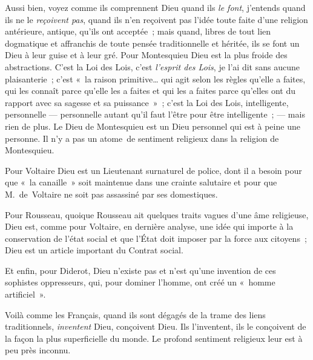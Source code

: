 \documentclass[french,twoside]{book} %
\begin{document}
\noindent Aussi bien, voyez comme ils comprennent Dieu quand ils {\itshape le font}, j’entends quand ils ne le {\itshape reçoivent pas}, quand ils n’en reçoivent pas l’idée toute faite d’une religion antérieure, antique, qu’ils ont acceptée ; mais quand, libres de tout lien dogmatique et affranchis de toute pensée traditionnelle et héritée, ils se font un Dieu à leur guise et à leur gré. Pour Montesquieu Dieu est la plus froide des abstractions. C’est la Loi des Lois, c’est \emph{l’esprit des Lois}, je l’ai dit sans aucune plaisanterie ; c’est « la raison primitive… qui agit selon les règles qu’elle a faites, qui les connaît parce qu’elle les a faites  et qui les a faites parce qu’elles ont du rapport avec sa sagesse et sa puissance » ; c’est la Loi des Lois, intelligente, personnelle — personnelle autant qu’il faut l’être pour être intelligente ; — mais rien de plus. Le Dieu de Montesquieu est un Dieu personnel qui est à peine une personne. Il n’y a pas un atome de sentiment religieux dans la religion de Montesquieu.\par
Pour Voltaire Dieu est un Lieutenant surnaturel de police, dont il a besoin pour que « la canaille » soit maintenue dans une crainte salutaire et pour que M. de Voltaire ne soit pas assassiné par ses domestiques.\par
Pour Rousseau, quoique Rousseau ait quelques traits vagues d’une âme religieuse, Dieu est, comme pour Voltaire, en dernière analyse, une idée qui importe à la conservation de l’état social et que l’État doit imposer par la force aux citoyens ; Dieu est un article important du Contrat social.\par
Et enfin, pour Diderot, Dieu n’existe pas et n’est qu’une invention de ces sophistes oppresseurs, qui, pour dominer l’homme, ont créé un « homme artificiel ».\par
Voilà comme les Français, quand ils sont dégagés de la trame des liens traditionnels, {\itshape inventent} Dieu, conçoivent Dieu. Ils l’inventent, ils le conçoivent de la façon la plus superficielle du monde.  Le profond sentiment religieux leur est à peu près inconnu.\par
\end{document}
